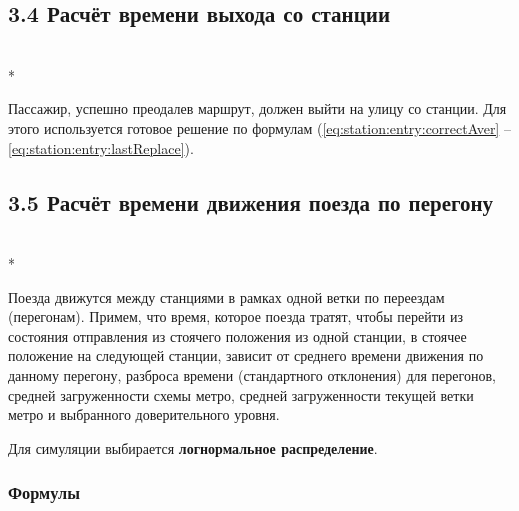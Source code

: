 \documentclass[12pt]{article}
\begin{document}
\subsection*{3.4 Расчёт времени выхода со станции}\mbox{}\\*

Пассажир, успешно преодалев маршрут, должен выйти на улицу со станции.
Для этого используется готовое решение по формулам (\ref{eq:station:entry:correctAver} -- \ref{eq:station:entry:lastReplace}).

\subsection*{3.5 Расчёт времени движения поезда по перегону}\mbox{}\\*

Поезда движутся между станциями в рамках одной ветки по переездам (перегонам).
Примем, что время, которое поезда тратят, чтобы перейти из состояния отправления
из стоячего положения из одной станции, в стоячее положение на следующей станции, зависит от
среднего времени движения по данному перегону, разброса времени (стандартного отклонения) для
перегонов, средней загруженности схемы метро, средней загруженности текущей ветки метро
и выбранного доверительного уровня.

Для симуляции выбирается \textbf{логнормальное распределение}.

\subsubsection*{Формулы}
\end{document}
